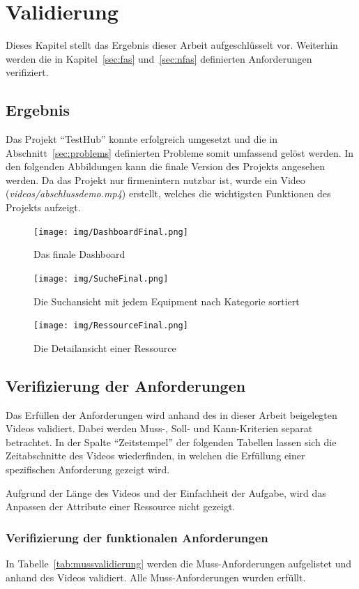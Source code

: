 \section{Validierung}
Dieses Kapitel stellt das Ergebnis dieser Arbeit aufgeschlüsselt vor. Weiterhin werden die in 
Kapitel~\ref{sec:fas} und~\ref{sec:nfas} definierten Anforderungen verifiziert.

\subsection{Ergebnis}
Das Projekt ``TestHub'' konnte erfolgreich umgesetzt und die in Abschnitt~\ref{sec:problems}
definierten Probleme somit umfassend gelöst werden. 
In den folgenden Abbildungen kann die finale Version des Projekts angesehen werden.
Da das Projekt nur firmenintern nutzbar ist, wurde ein Video 
(\textit{videos/abschlussdemo.mp4}) erstellt, welches die wichtigsten Funktionen des 
Projekts aufzeigt. 

\begin{figure}[H]
    \texttt{[image: img/DashboardFinal.png]}
    \caption{Das finale Dashboard}
\end{figure}

\begin{figure}[H]
    \texttt{[image: img/SucheFinal.png]}
    \caption{Die Suchansicht mit jedem Equipment nach Kategorie sortiert}
\end{figure}

\begin{figure}[H]
    \texttt{[image: img/RessourceFinal.png]}
    \caption{Die Detailansicht einer Ressource}
\end{figure}

\newpage

\subsection{Verifizierung der Anforderungen}
Das Erfüllen der Anforderungen wird anhand des in dieser Arbeit beigelegten Videos 
validiert. Dabei werden Muss-, Soll- und Kann-Kriterien separat betrachtet.
In der Spalte ``Zeitstempel'' der folgenden Tabellen lassen sich die Zeitabschnitte des Videos wiederfinden,
in welchen die Erfüllung einer spezifischen Anforderung gezeigt wird.

Aufgrund der Länge des Videos und der Einfachheit der Aufgabe, wird das Anpassen
der Attribute einer Ressource nicht gezeigt.

\subsubsection{Verifizierung der funktionalen Anforderungen}
In Tabelle~\ref{tab:mussvalidierung} werden die Muss-Anforderungen aufgelistet
und anhand des Videos validiert. Alle Muss-Anforderungen wurden erfüllt.

